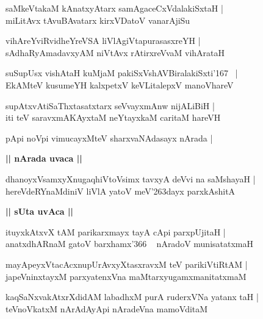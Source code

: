 \documentclass[twoside,12pt,openright]{book}
\def\S{\char'263}
\newcounter{shloka}[chapter]
\def\uvaca#1{\centerline{{\large\textbf{#1}}}}
\begin{document}
\begin{shloka}%
saMkeVtakaM kAnatxyAtarx samAgaceCxVdalakiSxtaH |\\
miLitAvx tAvuBAvatarx kirxVDatoV vanarAjiSu
\end{shloka}

\begin{shloka}%
vihAreYviRvidheYreVSA liVlAgiVtapurasasxreYH |\\
sAdhaRyAmadavxyAM niVtAvx rAtirxreVvaM vihArataH 
\end{shloka}

\begin{shloka}%
suSupUsx vishAtaH kuMjaM pakiSxVshAVBiralakiSxti\char'167 ~|\\
EkAMteV kusumeYH kalxpetxV keVLitalepxV manoVhareV 
\end{shloka}

\begin{shloka}%
supAtxvAtiSaThxtasatxtarx seVvayxmAnw nijALiBiH |\\
iti teV saravxmAKAyxtaM neYtayxkaM caritaM hareVH 
\end{shloka}

pApi noVpi vimucayxMteV sharxvaNAdasayx nArada |\\

\uvaca{|| nArada uvaca ||}

\begin{shloka}%
dhanoyxVsamxyXnugaqhiVtoVsimx tavxyA deVvi na saMshayaH |\\
hereVdeRYnaMdiniV liVlA yatoV meV\S dayx parxkAshitA 
\end{shloka}

\uvaca{|| sUta uvAca ||}

\begin{shloka}%
ituyxkAtxvX tAM parikarxmayx tayA cApi parxpUjitaH |\\
anatxdhARnaM gatoV barxhamx\char'366 ~ nAradoV munisatatxmaH 
\end{shloka}

\begin{shloka}%
mayApeyxVtacAcxnupUrAvxyXtasxravxM teV parikiVtiRtAM |\\
japeVninxtayxM parxyatenxVna maMtarxyugamxmanitatxmaM 
\end{shloka}

\begin{shloka}%
kaqSaNxvakAtxrXdidAM labadhxM purA ruderxVNa yatanx taH |\\
teVnoVkatxM nArAdAyApi nAradeVna mamoVditaM 
\end{shloka}
\end{document}
